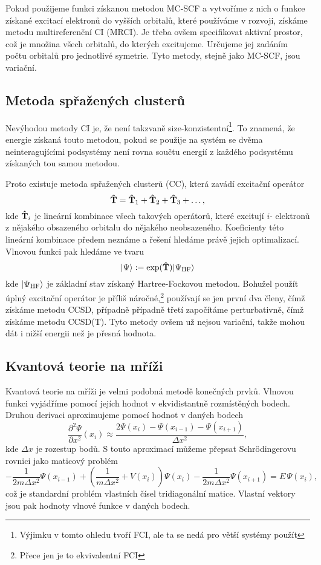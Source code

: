 Pokud použijeme funkci získanou metodou MC-SCF a vytvoříme z nich o funkce získané 
excitací elektronů do vyšších orbitalů, které používáme v rozvoji, získáme metodu
multireferenční CI (MRCI). Je třeba ovšem specifikovat aktivní prostor, což je množina
všech orbitalů, do kterých excitujeme. Určujeme jej zadáním počtu orbitalů pro 
jednotlivé symetrie. Tyto metody, stejně jako MC-SCF, jsou variační.

\subsection{Metoda spřažených clusterů}
Nevýhodou metody CI je, že není takzvaně size-konzistentní\footnote{Výjimku v tomto 
ohledu tvoří FCI, ale ta se nedá pro větší systémy použít}. To znamená, že energie 
získaná touto metodou, pokud se použije na systém se dvěma neinteragujícími podsystémy 
není rovna součtu energií z každého podsystému získaných tou samou metodou. 

Proto existuje metoda spřažených clusterů (CC), která zavádí excitační operátor
\begin{equation}
\mathbf{\hat{T}} = \mathbf{\hat{T}}_1 + \mathbf{\hat{T}}_2 + \mathbf{\hat{T}}_3 + \dots,
\end{equation}
kde $\mathbf{\hat{T}}_i$ je lineární kombinace všech takových operátorů, které excitují $i$-
elektronů z nějakého obsazeného orbitalu do nějakého neobsazeného.
Koeficienty této lineární kombinace předem neznáme a řešení hledáme právě
jejich optimalizací.
Vlnovou funkci pak hledáme ve tvaru
\begin{equation}
| \Psi \rangle := \exp(\mathbf{\hat{T}}) | \Psi_\mathrm{HF} \rangle
\end{equation}
kde $| \Psi_\mathrm{HF} \rangle$ je základní stav získaný Hartree-Fockovou metodou.
Bohužel použít úplný excitační operátor je příliš náročné,\footnote{Přece jen je to 
ekvivalentní FCI} používají se jen první dva členy, čímž získáme metodu CCSD, případně 
případně třetí započítáme perturbativně, čímž získáme metodu CCSD(T). 
Tyto metody ovšem už nejsou variační, takže mohou dát i nižší energii než je přesná hodnota. 

\subsection{Kvantová teorie na mříži}
Kvantová teorie na mříži je velmi podobná metodě konečných prvků.
Vlnovou funkci vyjádříme pomocí jejích hodnot v ekvidistantně rozmístěných bodech.
Druhou derivaci aproximujeme pomocí hodnot v daných bodech
\begin{equation}
\frac{\partial^2 \Psi}{\partial x^2}(x_i) \approx \frac{2\Psi(x_i)-\Psi(x_{i-1})-
\Psi(x_{i+1})}{\Delta x^2},
\end{equation}
kde $\Delta x$ je rozestup bodů.
S touto aproximací můžeme přepsat Schrödingerovu rovnici jako maticový problém
\begin{equation}
-\frac{1}{2m\Delta x^2} \Psi(x_{i-1}) 
+ \left(\frac{1}{m\Delta x^2}+V(x_i)\right) \Psi(x_i)
-\frac{1}{2m\Delta x^2} \Psi(x_{i+1}) = E\,\Psi(x_i),
\end{equation}
což je standardní problém vlastních čísel tridiagonální matice.
Vlastní vektory jsou pak hodnoty vlnové funkce v daných bodech.
